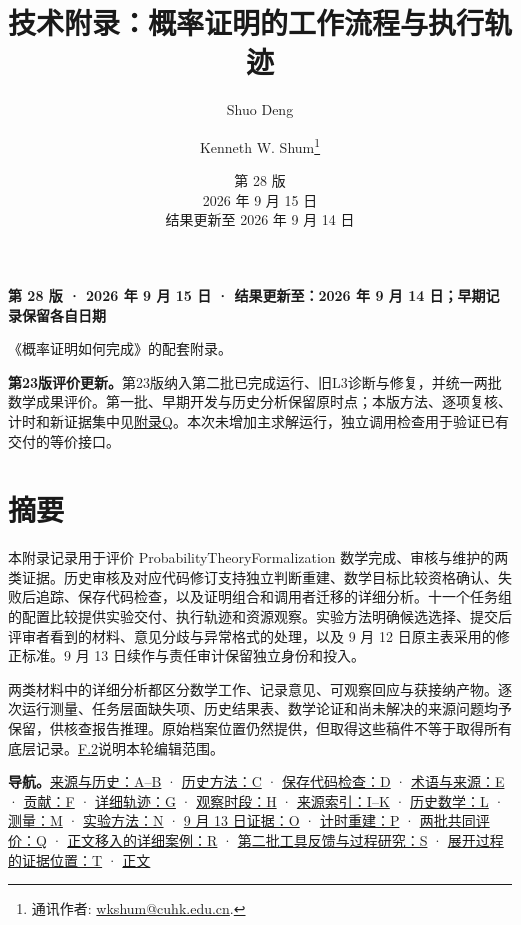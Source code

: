 
\title{技术附录：概率证明的工作流程与执行轨迹}
\author{Shuo Deng \and Kenneth W. Shum\thanks{通讯作者: \href{mailto:wkshum@cuhk.edu.cn}{wkshum@cuhk.edu.cn}.}}\date{第 28 版\\2026 年 9 月 15 日\\结果更新至 2026 年 9 月 14 日}
\maketitle
\textbf{第 28 版 · 2026 年 9 月 15 日 · 结果更新至：2026 年 9 月 14 日；早期记录保留各自日期}

《概率证明如何完成》的配套附录。

\textbf{第23版评价更新。}第23版纳入第二批已完成运行、旧L3诊断与修复，并统一两批数学成果评价。第一批、早期开发与历史分析保留原时点；本版方法、逐项复核、计时和新证据集中见\hyperlink{appendix-q}{附录Q}。本次未增加主求解运行，独立调用检查用于验证已有交付的等价接口。

\section*{\texorpdfstring{\protect\hypertarget{abstract}{}摘要}{摘要}}
本附录记录用于评价 ProbabilityTheoryFormalization 数学完成、审核与维护的两类证据。历史审核及对应代码修订支持独立判断重建、数学目标比较资格确认、失败后追踪、保存代码检查，以及证明组合和调用者迁移的详细分析。十一个任务组的配置比较提供实验交付、执行轨迹和资源观察。实验方法明确候选选择、提交后评审者看到的材料、意见分歧与异常格式的处理，以及 9 月 12 日原主表采用的修正标准。9 月 13 日续作与责任审计保留独立身份和投入。

两类材料中的详细分析都区分数学工作、记录意见、可观察回应与获接纳产物。逐次运行测量、任务层面缺失项、历史结果表、数学论证和尚未解决的来源问题均予保留，供核查报告推理。原始档案位置仍然提供，但取得这些稿件不等于取得所有底层记录。\hyperlink{f2}{F.2}说明本轮编辑范围。

\textbf{导航。}\hyperlink{appendix-a}{来源与历史：A–B} · \hyperlink{appendix-c}{历史方法：C} · \hyperlink{appendix-d}{保存代码检查：D} · \hyperlink{appendix-e}{术语与来源：E} · \hyperlink{appendix-f}{贡献：F} · \hyperlink{appendix-g}{详细轨迹：G} · \hyperlink{appendix-h}{观察时段：H} · \hyperlink{appendix-i}{来源索引：I–K} · \hyperlink{appendix-l}{历史数学：L} · \hyperlink{appendix-m}{测量：M} · \hyperlink{appendix-n}{实验方法：N} · \hyperlink{appendix-o}{9 月 13 日证据：O} · \hyperlink{appendix-p}{计时重建：P} · \hyperlink{appendix-q}{两批共同评价：Q} · \hyperlink{appendix-r}{正文移入的详细案例：R} · \hyperlink{appendix-s}{第二批工具反馈与过程研究：S} · \hyperlink{appendix-t}{展开过程的证据位置：T} · \href{zh.pdf}{正文}

